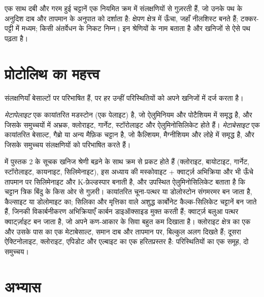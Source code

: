 एक साथ दबी और गरम हुई चट्टानें एक नियमित क्रम में संलक्षणियों से गुज़रती हैं, जो
उनके पथ के अनुदिश दाब और तापमान के अनुपात को दर्शाता है: क्षेपण
क्षेत्र में ऊँचा, जहाँ नीलशिस्ट बनते हैं; टक्कर-पट्टी में मध्यम; किसी अंतर्वेधन के निकट निम्न।
 इन श्रेणियों के नाम बताता है और खनिजों से ऐसे पथ पढ़ता है।

\section{प्रोटोलिथ का महत्त्व}\label{sec:b2:metamorphic-facies:protoliths}

संलक्षणियाँ बेसाल्टों पर परिभाषित हैं, पर हर  उन्हीं परिस्थितियों को
अपने खनिजों में दर्ज करता है।

\begin{definition}[मेटापेलाइट; मेटाबेसाइट]\label{def:b2:metamorphic-facies:protoliths}
\emph{मेटापेलाइट} एक कायांतरित मडस्टोन (एक पेलाइट) है, जो
ऐलुमिनियम और पोटैशियम में समृद्ध है, और जिसके समुच्चयों में अभ्रक, क्लोराइट, गार्नेट, स्टॉरोलाइट और
ऐलुमिनोसिलिकेट होते हैं। \emph{मेटाबेसाइट} एक कायांतरित बेसाल्ट,
गैब्रो या अन्य मैफ़िक चट्टान है, जो कैल्शियम, मैग्नीशियम और लोहे में समृद्ध है, और जिसके समुच्चय
संलक्षणियों को परिभाषित करते हैं।
\end{definition}

 में पुस्तक 2 के सूचक खनिज  श्रेणी बढ़ने के साथ क्रम से प्रकट होते हैं
(क्लोराइट, बायोटाइट, गार्नेट, स्टॉरोलाइट, कायनाइट, सिलिमेनाइट), इस अध्याय की
मस्कोवाइट + क्वार्ट्ज़ अभिक्रिया और भी ऊँचे तापमान पर सिलिमेनाइट और K-फ़ेल्डस्पार बनाती है,
और उपस्थित ऐलुमिनोसिलिकेट बताता है कि चट्टान त्रिक
बिंदु के किस ओर से गुज़री। कायांतरित चूना-पत्थर या डोलोस्टोन संगमरमर बन जाता है, कैल्साइट या
डोलोमाइट का; सिलिका और मृत्तिका वाले अशुद्ध कार्बोनेट कैल्क-सिलिकेट चट्टानें बन जाते हैं, जिनकी
विकार्बनीकरण अभिक्रियाएँ कार्बन डाइऑक्साइड मुक्त करती हैं; क्वार्ट्ज़ बलुआ पत्थर क्वार्ट्ज़ाइट बन जाता है,
जो अपने कण-आकार के सिवा बहुत कम दिखाता है। क्लोराइट क्षेत्र का एक  और उसके पास का एक
मेटाबेसाल्ट, समान दाब और तापमान पर, बिल्कुल अलग दिखते हैं; दूसरा
ऐक्टिनोलाइट, क्लोराइट, एपिडोट और एल्बाइट का एक हरितप्रस्तर है: परिस्थितियों का एक समूह,
दो समुच्चय।

\section{अभ्यास}

